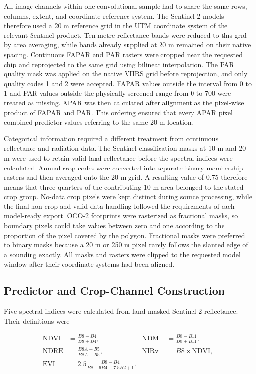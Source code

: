 All image channels within one convolutional sample had to share the same rows, columns, extent, and coordinate reference system. The Sentinel-2 models therefore used a 20 m reference grid in the UTM coordinate system of the relevant Sentinel product. Ten-metre reflectance bands were reduced to this grid by area averaging, while bands already supplied at 20 m remained on their native spacing. Continuous FAPAR and PAR rasters were cropped near the requested chip and reprojected to the same grid using bilinear interpolation. The PAR quality mask was applied on the native VIIRS grid before reprojection, and only quality codes 1 and 2 were accepted. FAPAR values outside the interval from 0 to 1 and PAR values outside the physically screened range from 0 to 700 were treated as missing. APAR was then calculated after alignment as the pixel-wise product of FAPAR and PAR. This ordering ensured that every APAR pixel combined predictor values referring to the same 20 m location.

Categorical information required a different treatment from continuous reflectance and radiation data. The Sentinel classification masks at 10 m and 20 m were used to retain valid land reflectance before the spectral indices were calculated. Annual crop codes were converted into separate binary membership rasters and then averaged onto the 20 m grid. A resulting value of 0.75 therefore means that three quarters of the contributing 10 m area belonged to the stated crop group. No-data crop pixels were kept distinct during source processing, while the final non-crop and valid-data handling followed the requirements of each model-ready export. OCO-2 footprints were rasterized as fractional masks, so boundary pixels could take values between zero and one according to the proportion of the pixel covered by the polygon. Fractional masks were preferred to binary masks because a 20 m or 250 m pixel rarely follows the slanted edge of a sounding exactly. All masks and rasters were clipped to the requested model window after their coordinate systems had been aligned.

\subsection{Predictor and Crop-Channel Construction}

Five spectral indices were calculated from land-masked Sentinel-2 reflectance. Their definitions were

\begin{align}
    \mathrm{NDVI} &= \frac{B8-B4}{B8+B4}, &
    \mathrm{NDMI} &= \frac{B8-B11}{B8+B11}, \nonumber\\
    \mathrm{NDRE} &= \frac{B8A-B5}{B8A+B5}, &
    \mathrm{NIRv} &= B8\times\mathrm{NDVI}, \nonumber\\
    \mathrm{EVI} &= 2.5\frac{B8-B4}{B8+6B4-7.5B2+1}.
    \label{eq:sentinel_indices}
\end{align}

